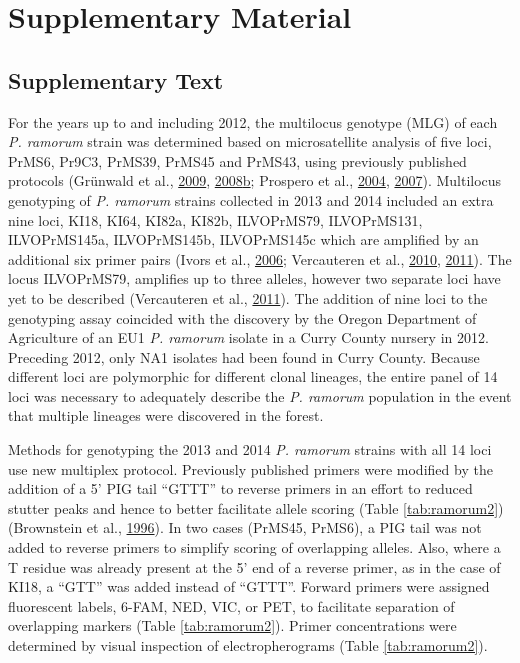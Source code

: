\documentclass[double,12pt]{beavtex}
\begin{document}
  \section{Supplementary Material}\label{supplementary-material}
  
  \subsection{Supplementary Text}\label{text:S1}
  
  For the years up to and including 2012, the multilocus genotype (MLG) of
  each \emph{P. ramorum} strain was determined based on microsatellite
  analysis of five loci, PrMS6, Pr9C3, PrMS39, PrMS45 and PrMS43, using
  previously published protocols (Grünwald et al.,
  \protect\hyperlink{ref-grunwald2009standardizing}{2009},
  \protect\hyperlink{ref-grunwald2008susceptibility}{2008}\protect\hyperlink{ref-grunwald2008susceptibility}{b};
  Prospero et al., \protect\hyperlink{ref-prospero2004isolation}{2004},
  \protect\hyperlink{ref-prospero2007population}{2007}). Multilocus
  genotyping of \emph{P. ramorum} strains collected in 2013 and 2014
  included an extra nine loci, KI18, KI64, KI82a, KI82b, ILVOPrMS79,
  ILVOPrMS131, ILVOPrMS145a, ILVOPrMS145b, ILVOPrMS145c which are
  amplified by an additional six primer pairs (Ivors et al.,
  \protect\hyperlink{ref-ivors2006microsatellite}{2006}; Vercauteren et
  al., \protect\hyperlink{ref-vercauteren2010clonal}{2010},
  \protect\hyperlink{ref-vercauteren2011identification}{2011}). The locus
  ILVOPrMS79, amplifies up to three alleles, however two separate loci
  have yet to be described (Vercauteren et al.,
  \protect\hyperlink{ref-vercauteren2011identification}{2011}). The
  addition of nine loci to the genotyping assay coincided with the
  discovery by the Oregon Department of Agriculture of an EU1 \emph{P.
  ramorum} isolate in a Curry County nursery in 2012. Preceding 2012, only
  NA1 isolates had been found in Curry County. Because different loci are
  polymorphic for different clonal lineages, the entire panel of 14 loci
  was necessary to adequately describe the \emph{P. ramorum} population in
  the event that multiple lineages were discovered in the forest.
  
  Methods for genotyping the 2013 and 2014 \emph{P. ramorum} strains with
  all 14 loci use new multiplex protocol. Previously published primers
  were modified by the addition of a 5' PIG tail ``GTTT'' to reverse
  primers in an effort to reduced stutter peaks and hence to better
  facilitate allele scoring (Table \ref{tab:ramorum2}) (Brownstein et al.,
  \protect\hyperlink{ref-brownstein1996modulation}{1996}). In two cases
  (PrMS45, PrMS6), a PIG tail was not added to reverse primers to simplify
  scoring of overlapping alleles. Also, where a T residue was already
  present at the 5' end of a reverse primer, as in the case of KI18, a
  ``GTT'' was added instead of ``GTTT''. Forward primers were assigned
  fluorescent labels, 6-FAM, NED, VIC, or PET, to facilitate separation of
  overlapping markers (Table \ref{tab:ramorum2}). Primer concentrations
  were determined by visual inspection of electropherograms (Table
  \ref{tab:ramorum2}).
  
\end{document}
